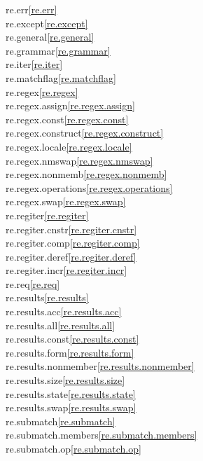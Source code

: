 \begin{multicols}{2}
re.err\quad\ref{re.err}\\
re.except\quad\ref{re.except}\\
re.general\quad\ref{re.general}\\
re.grammar\quad\ref{re.grammar}\\
re.iter\quad\ref{re.iter}\\
re.matchflag\quad\ref{re.matchflag}\\
re.regex\quad\ref{re.regex}\\
re.regex.assign\quad\ref{re.regex.assign}\\
re.regex.const\quad\ref{re.regex.const}\\
re.regex.construct\quad\ref{re.regex.construct}\\
re.regex.locale\quad\ref{re.regex.locale}\\
re.regex.nmswap\quad\ref{re.regex.nmswap}\\
re.regex.nonmemb\quad\ref{re.regex.nonmemb}\\
re.regex.operations\quad\ref{re.regex.operations}\\
re.regex.swap\quad\ref{re.regex.swap}\\
re.regiter\quad\ref{re.regiter}\\
re.regiter.cnstr\quad\ref{re.regiter.cnstr}\\
re.regiter.comp\quad\ref{re.regiter.comp}\\
re.regiter.deref\quad\ref{re.regiter.deref}\\
re.regiter.incr\quad\ref{re.regiter.incr}\\
re.req\quad\ref{re.req}\\
re.results\quad\ref{re.results}\\
re.results.acc\quad\ref{re.results.acc}\\
re.results.all\quad\ref{re.results.all}\\
re.results.const\quad\ref{re.results.const}\\
re.results.form\quad\ref{re.results.form}\\
re.results.nonmember\quad\ref{re.results.nonmember}\\
re.results.size\quad\ref{re.results.size}\\
re.results.state\quad\ref{re.results.state}\\
re.results.swap\quad\ref{re.results.swap}\\
re.submatch\quad\ref{re.submatch}\\
re.submatch.members\quad\ref{re.submatch.members}\\
re.submatch.op\quad\ref{re.submatch.op}\\

\end{multicols}
